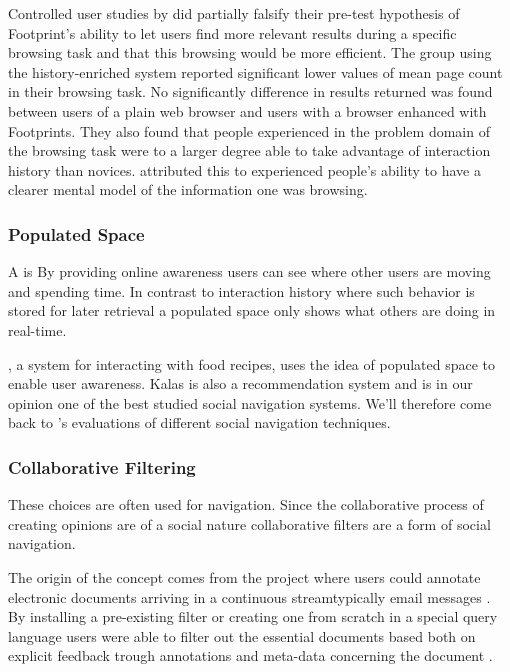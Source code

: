 Controlled user studies by \citeauthor{wexelblat99} did partially falsify
their pre-test hypothesis of Footprint's ability to let users find more
relevant results during a specific browsing task and that this browsing
would be more efficient. The group using the history-enriched system reported
significant lower values of mean page count in their browsing task. No
significantly difference in results returned was found between users of a
plain web browser and users with a browser enhanced with Footprints. They also
found that people experienced in the problem domain of the browsing task were
to a larger degree able to take advantage of interaction history than novices.
\citeauthor{wexelblat99} attributed this to experienced people's ability to
have a clearer mental model of the information one was browsing.

\subsubsection{Populated Space}

A  is
By providing online awareness users can see where other users are moving and
spending time. In contrast to interaction history where such behavior is
stored for later retrieval a populated space only shows what others are doing
in real-time.

 \citep{svensson05}, a system for interacting with food
recipes, uses the idea of populated space to enable user awareness. Kalas is
also a recommendation system and is in our opinion one of the best studied
social navigation systems. We'll therefore come back to
\citeauthor{svensson05}'s evaluations of different social
navigation techniques.

\subsubsection{Collaborative Filtering}
\label{section:background.social.navigation.applied.forms.collaborative.filtering}

 
These choices are often used for navigation. Since the collaborative process
of creating opinions are of a social nature collaborative filters are a form
of social navigation.

The origin of the concept comes from the 
project where users could annotate electronic documents arriving in a
continuous stream\dash{}typically email messages \citep[]{goldberg92}. By
installing a pre-existing filter or creating one from scratch in a
special query language users were able to filter out the essential documents
based both on explicit feedback trough annotations and
meta-data concerning the document \citep[]{goldberg92}.


